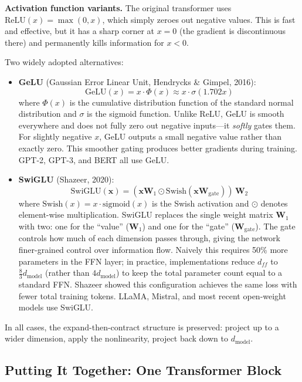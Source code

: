 \begin{notebox}
\textbf{Activation function variants.} The original transformer uses $\text{ReLU}(x) = \max(0, x)$, which simply zeroes out negative values. This is fast and effective, but it has a sharp corner at $x = 0$ (the gradient is discontinuous there) and permanently kills information for $x < 0$.

Two widely adopted alternatives:
\begin{itemize}
    \item \textbf{GeLU} (Gaussian Error Linear Unit, Hendrycks \& Gimpel, 2016):
    \[
    \text{GeLU}(x) = x \cdot \Phi(x) \approx x \cdot \sigma(1.702x)
    \]
    where $\Phi(x)$ is the cumulative distribution function of the standard normal distribution and $\sigma$ is the sigmoid function. Unlike ReLU, GeLU is smooth everywhere and does not fully zero out negative inputs---it \emph{softly} gates them. For slightly negative $x$, GeLU outputs a small negative value rather than exactly zero. This smoother gating produces better gradients during training. GPT-2, GPT-3, and BERT all use GeLU.

    \item \textbf{SwiGLU} (Shazeer, 2020):
    \[
    \text{SwiGLU}(\mathbf{x}) = (\mathbf{x}\mathbf{W}_1 \odot \text{Swish}(\mathbf{x}\mathbf{W}_{\text{gate}}))\,\mathbf{W}_2
    \]
    where $\text{Swish}(x) = x \cdot \text{sigmoid}(x)$ is the Swish activation and $\odot$ denotes element-wise multiplication. SwiGLU replaces the single weight matrix $\mathbf{W}_1$ with two: one for the ``value'' ($\mathbf{W}_1$) and one for the ``gate'' ($\mathbf{W}_{\text{gate}}$). The gate controls how much of each dimension passes through, giving the network finer-grained control over information flow. Naively this requires 50\% more parameters in the FFN layer; in practice, implementations reduce $d_{ff}$ to $\frac{8}{3}d_{\text{model}}$ (rather than $4d_{\text{model}}$) to keep the total parameter count equal to a standard FFN. Shazeer showed this configuration achieves the same loss with fewer total training tokens. LLaMA, Mistral, and most recent open-weight models use SwiGLU.
\end{itemize}
In all cases, the expand-then-contract structure is preserved: project up to a wider dimension, apply the nonlinearity, project back down to $d_{\text{model}}$.
\end{notebox}

\subsection{Putting It Together: One Transformer Block}
\label{sec:one-block}

